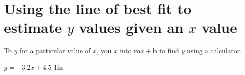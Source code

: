 \section{Using the line of best fit to estimate $y$ values given an $x$ value}

\begin{tcolorbox}[center,width=5.5in]
    \small
    To  $y$ 
    for a particular value of $x$, 
    you  $x$ into $\bm{m}x + \bm{b}$ 
    to find $y$ using a calculator.
\end{tcolorbox}

{
    $y = -3.2x + 4.5$
}
{1in}